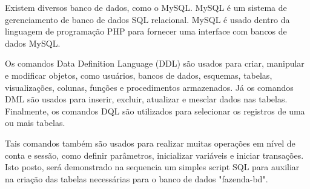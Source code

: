 Existem diversos banco de dados, como o MySQL. MySQL é um sistema de gerenciamento de banco de dados SQL relacional. MySQL é usado dentro da linguagem de programação PHP para fornecer uma interface com bancos de dados MySQL.

Os comandos Data Definition Language (DDL) são usados para criar, manipular e modificar objetos, como usuários, bancos de dados, esquemas, tabelas, visualizações, colunas, funções e procedimentos armazenados. Já os comandos DML são usados para inserir, excluir, atualizar e mesclar dados nas tabelas. Finalmente, os comandos DQL são utilizados para selecionar os registros de uma ou mais tabelas.

Tais comandos também são usados para realizar muitas operações em nível de conta e sessão, como definir parâmetros, inicializar variáveis e iniciar transações.
Isto posto, será demonstrado na sequencia um simples script SQL para auxiliar na criação das tabelas necessárias para o banco de dados "fazenda-bd".

